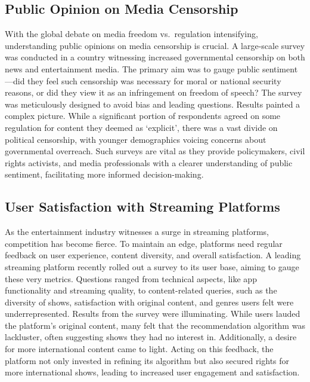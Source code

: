 \documentclass[
  b5paper]{book}
\begin{document}
\hypertarget{public-opinion-on-media-censorship}{%
\subsection*{Public Opinion on Media Censorship}\label{public-opinion-on-media-censorship}}

With the global debate on media freedom vs.~regulation intensifying, understanding public opinions on media censorship is crucial. A large-scale survey was conducted in a country witnessing increased governmental censorship on both news and entertainment media. The primary aim was to gauge public sentiment---did they feel such censorship was necessary for moral or national security reasons, or did they view it as an infringement on freedom of speech? The survey was meticulously designed to avoid bias and leading questions. Results painted a complex picture. While a significant portion of respondents agreed on some regulation for content they deemed as `explicit', there was a vast divide on political censorship, with younger demographics voicing concerns about governmental overreach. Such surveys are vital as they provide policymakers, civil rights activists, and media professionals with a clearer understanding of public sentiment, facilitating more informed decision-making.

\hypertarget{user-satisfaction-with-streaming-platforms}{%
\subsection*{User Satisfaction with Streaming Platforms}\label{user-satisfaction-with-streaming-platforms}}

As the entertainment industry witnesses a surge in streaming platforms, competition has become fierce. To maintain an edge, platforms need regular feedback on user experience, content diversity, and overall satisfaction. A leading streaming platform recently rolled out a survey to its user base, aiming to gauge these very metrics. Questions ranged from technical aspects, like app functionality and streaming quality, to content-related queries, such as the diversity of shows, satisfaction with original content, and genres users felt were underrepresented. Results from the survey were illuminating. While users lauded the platform's original content, many felt that the recommendation algorithm was lackluster, often suggesting shows they had no interest in. Additionally, a desire for more international content came to light. Acting on this feedback, the platform not only invested in refining its algorithm but also secured rights for more international shows, leading to increased user engagement and satisfaction.
\end{document}
